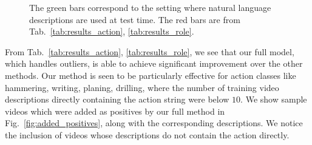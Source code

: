 \documentclass[10pt,twocolumn,letterpaper]{article}
\begin{document}
\addtolength{\subfigcapskip}{-0.1in}
\begin{figure}[ht!]
\centering
      \caption{The green bars correspond to the setting where natural language descriptions are
      used at test time. The red bars
      are from Tab.~\ref{tab:results_action}, \ref{tab:results_role}.}
\label{fig:action_role_text}
\end{figure}

From Tab.~\ref{tab:results_action}, \ref{tab:results_role},
we see that our full model, which handles outliers, is able to achieve
significant improvement over the other methods.
Our method is seen to be particularly
effective for action classes like
hammering, writing, planing, drilling, where the number of training video
descriptions directly containing the action string were below $10$. We show
sample videos which were added as positives by our full method in
Fig.~\ref{fig:added_positives}, along with the corresponding descriptions. We
notice the inclusion of videos whose descriptions do not contain the action
directly. 
\end{document}
